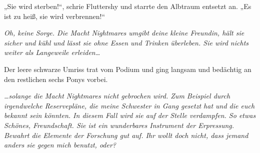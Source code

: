 „Sie wird sterben!“, schrie Fluttershy und starrte den Albtraum entsetzt an.
„Es ist zu heiß, sie wird verbrennen!“

\emph{Oh, keine Sorge. Die Macht Nightmares umgibt deine kleine Freundin, hält sie sicher und kühl und lässt sie ohne Essen und Trinken überleben. Sie wird nichts weiter als Langeweile erleiden…}

Der leere schwarze Umriss trat vom Podium und ging langsam und bedächtig an den restlichen sechs Ponys vorbei.

\emph{…solange die Macht Nightmares nicht gebrochen wird. Zum Beispiel durch irgendwelche Reservepläne, die meine Schwester in Gang gesetzt hat und die euch bekannt sein könnten. In diesem Fall wird sie auf der Stelle verdampfen. So etwas Schönes, Freundschaft. Sie ist ein wunderbares Instrument der Erpressung. Bewahrt die Elemente der Forschung gut auf. Ihr wollt doch nicht, dass jemand anders sie gegen mich benutzt, oder?}

